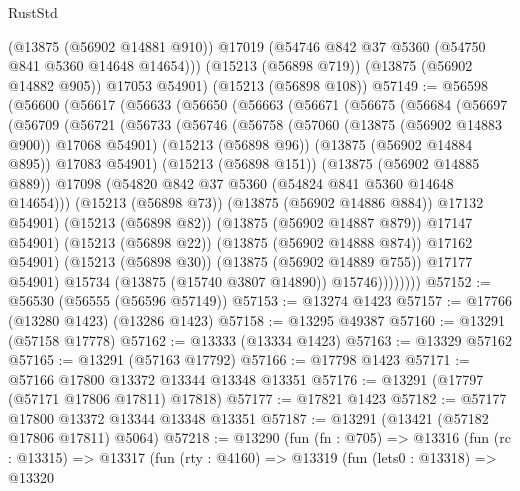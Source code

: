 \begin{lexlean}{RustStd}
\begin{coremodule}
        (@13875 (@56902 @14881 @910))
        @17019
        (@54746 @842 @37 @5360 (@54750 @841 @5360 @14648 @14654)))
      (@15213 (@56898 @719))
      (@13875 (@56902 @14882 @905))
      @17053
      @54901)
    (@15213 (@56898 @108))
@57149 := @56598
    (@56600
      (@56617
        (@56633
          (@56650
            (@56663
              (@56671
                (@56675
                  (@56684
                    (@56697
                      (@56709
                        (@56721
                          (@56733
                            (@56746
                              (@56758
                                (@57060 (@13875 (@56902 @14883 @900)) @17068 @54901)
                                (@15213 (@56898 @96))
                                (@13875 (@56902 @14884 @895))
                                @17083
                                @54901)
                              (@15213 (@56898 @151))
                              (@13875 (@56902 @14885 @889))
                              @17098
                              (@54820 @842 @37 @5360 (@54824 @841 @5360 @14648 @14654)))
                            (@15213 (@56898 @73))
                            (@13875 (@56902 @14886 @884))
                            @17132
                            @54901)
                          (@15213 (@56898 @82))
                          (@13875 (@56902 @14887 @879))
                          @17147
                          @54901)
                        (@15213 (@56898 @22))
                        (@13875 (@56902 @14888 @874))
                        @17162
                        @54901)
                      (@15213 (@56898 @30))
                      (@13875 (@56902 @14889 @755))
                      @17177
                      @54901)
                    @15734
                    (@13875 (@15740 @3807 @14890))
                    @15746))))))))
@57152 := @56530 (@56555 (@56596 @57149))
@57153 := @13274 @1423
@57157 := @17766 (@13280 @1423) (@13286 @1423)
@57158 := @13295 @49387
@57160 := @13291 (@57158 @17778)
@57162 := @13333 (@13334 @1423)
@57163 := @13329 @57162
@57165 := @13291 (@57163 @17792)
@57166 := @17798 @1423
@57171 := @57166 @17800 @13372 @13344 @13348 @13351
@57176 := @13291 (@17797 (@57171 @17806 @17811) @17818)
@57177 := @17821 @1423
@57182 := @57177 @17800 @13372 @13344 @13348 @13351
@57187 := @13291 (@13421 (@57182 @17806 @17811) @5064)
@57218 := @13290
    (fun (fn : @705) =>
    @13316
      (fun (rc : @13315) =>
      @13317
        (fun (rty : @4160) =>
        @13319
          (fun (lets0 : @13318) =>
          @13320

\end{coremodule}
\end{lexlean}
